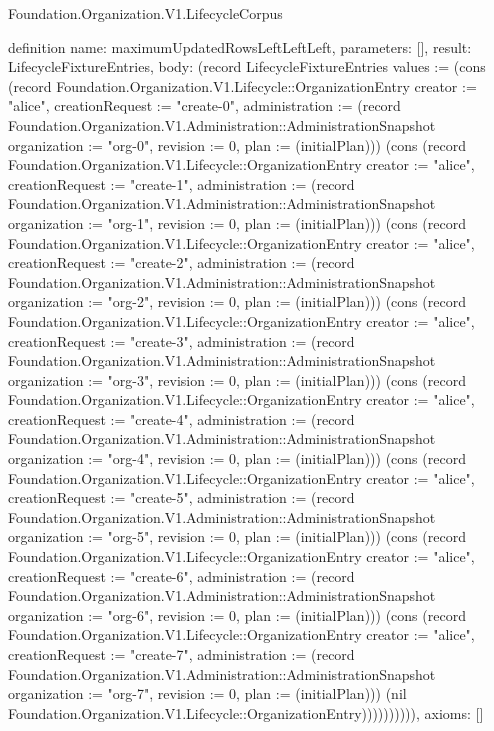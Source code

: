 \begin{lexlean}{Foundation.Organization.V1.LifecycleCorpus}
\begin{semanticmodule}
definition{
  name: maximumUpdatedRowsLeftLeftLeft,
  parameters: [],
  result: LifecycleFixtureEntries,
  body: (record LifecycleFixtureEntries {values := (cons (record Foundation.Organization.V1.Lifecycle::OrganizationEntry {creator := "alice", creationRequest := "create-0", administration := (record Foundation.Organization.V1.Administration::AdministrationSnapshot {organization := "org-0", revision := 0, plan := (initialPlan)})}) (cons (record Foundation.Organization.V1.Lifecycle::OrganizationEntry {creator := "alice", creationRequest := "create-1", administration := (record Foundation.Organization.V1.Administration::AdministrationSnapshot {organization := "org-1", revision := 0, plan := (initialPlan)})}) (cons (record Foundation.Organization.V1.Lifecycle::OrganizationEntry {creator := "alice", creationRequest := "create-2", administration := (record Foundation.Organization.V1.Administration::AdministrationSnapshot {organization := "org-2", revision := 0, plan := (initialPlan)})}) (cons (record Foundation.Organization.V1.Lifecycle::OrganizationEntry {creator := "alice", creationRequest := "create-3", administration := (record Foundation.Organization.V1.Administration::AdministrationSnapshot {organization := "org-3", revision := 0, plan := (initialPlan)})}) (cons (record Foundation.Organization.V1.Lifecycle::OrganizationEntry {creator := "alice", creationRequest := "create-4", administration := (record Foundation.Organization.V1.Administration::AdministrationSnapshot {organization := "org-4", revision := 0, plan := (initialPlan)})}) (cons (record Foundation.Organization.V1.Lifecycle::OrganizationEntry {creator := "alice", creationRequest := "create-5", administration := (record Foundation.Organization.V1.Administration::AdministrationSnapshot {organization := "org-5", revision := 0, plan := (initialPlan)})}) (cons (record Foundation.Organization.V1.Lifecycle::OrganizationEntry {creator := "alice", creationRequest := "create-6", administration := (record Foundation.Organization.V1.Administration::AdministrationSnapshot {organization := "org-6", revision := 0, plan := (initialPlan)})}) (cons (record Foundation.Organization.V1.Lifecycle::OrganizationEntry {creator := "alice", creationRequest := "create-7", administration := (record Foundation.Organization.V1.Administration::AdministrationSnapshot {organization := "org-7", revision := 0, plan := (initialPlan)})}) (nil Foundation.Organization.V1.Lifecycle::OrganizationEntry)))))))))}),
  axioms: []
}


\end{semanticmodule}
\end{lexlean}
